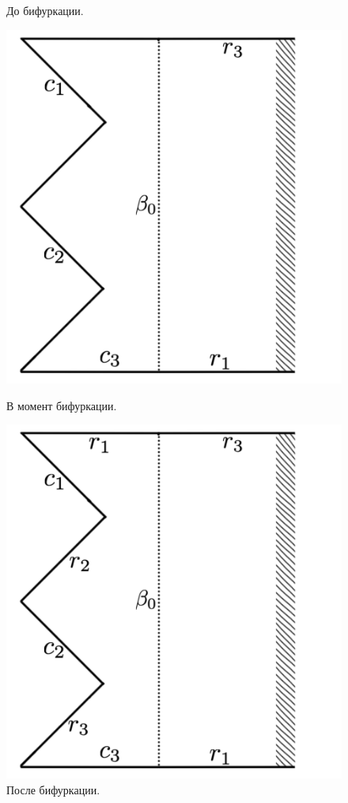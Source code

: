\begin{figure}[!htb]
    \caption{До бифуркации.}
        \label{fig:pt10:_II_before_segment}
\endminipage\hfill
{}
\centering
\includegraphics[scale=0.11]{images/ch4/section3_circular/atoms/II/bifurcation/page_segment.pdf}
    \caption{В момент бифуркации.}
    \label{fig:pt10:_II_page_segment}
\endminipage\hfill
{}
\centering
\includegraphics[scale=0.11]{images/ch4/section3_circular/atoms/II/after/page_segment.pdf}
    \caption{После бифуркации.}
    \label{fig:pt10:_II_after_page_segment}
\endminipage\hfill
\end{figure}

